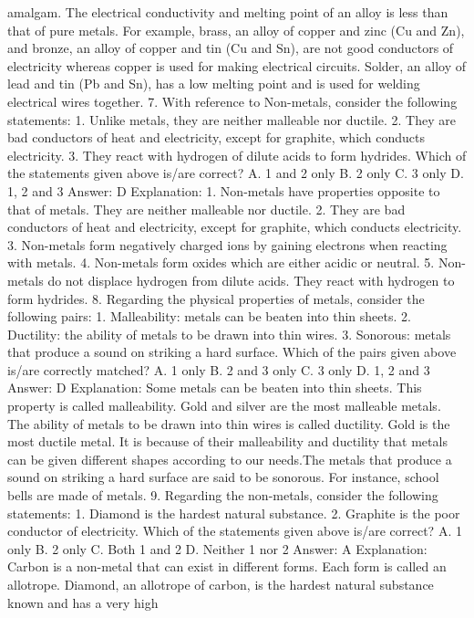 amalgam. The electrical conductivity and melting point of an alloy is
less than that of pure metals. For example, brass, an alloy of copper
and zinc (Cu and Zn), and bronze, an alloy of copper and tin (Cu and
Sn), are not good conductors of electricity whereas copper is used
for making electrical circuits.
Solder, an alloy of lead and tin (Pb and Sn), has a low melting point
and is used for welding electrical wires together.
7. With reference to Non-metals, consider the following
statements:
1. Unlike metals, they are neither malleable nor ductile.
2. They are bad conductors of heat and electricity, except for
graphite, which conducts electricity.
3. They react with hydrogen of dilute acids to form hydrides.
Which of the statements given above is/are correct?
A. 1 and 2 only
B. 2 only
C. 3 only
D. 1, 2 and 3
Answer: D
Explanation:
1. Non-metals have properties opposite to that of metals. They are
neither malleable nor ductile.
2. They are bad conductors of heat and electricity, except for
graphite, which conducts electricity.
3. Non-metals form negatively charged ions by gaining electrons
when reacting with metals.
4. Non-metals form oxides which are either acidic or neutral.
5. Non-metals do not displace hydrogen from dilute acids. They
react with hydrogen to form hydrides.
8. Regarding the physical properties of metals, consider the
following pairs:
1. Malleability: metals can be beaten into thin sheets.
2. Ductility: the ability of metals to be drawn into thin wires.
3. Sonorous: metals that produce a sound on striking a hard surface.
Which of the pairs given above is/are correctly matched?
A. 1 only
B. 2 and 3 only
C. 3 only
D. 1, 2 and 3
Answer: D
Explanation: Some metals can be beaten into thin sheets. This
property is called malleability. Gold and silver are the most malleable
metals.
The ability of metals to be drawn into thin wires is called ductility.
Gold is the most ductile metal.
It is because of their malleability and ductility that metals can be
given different shapes according to our needs.The metals that
produce a sound on striking a hard surface are said to be sonorous.
For instance, school bells are made of metals.
9. Regarding the non-metals, consider the following statements:
1. Diamond is the hardest natural substance.
2. Graphite is the poor conductor of electricity.
Which of the statements given above is/are correct?
A. 1 only
B. 2 only
C. Both 1 and 2
D. Neither 1 nor 2
Answer: A
Explanation: Carbon is a non-metal that can exist in different
forms. Each form is called an allotrope. Diamond, an allotrope of
carbon, is the hardest natural substance known and has a very high
